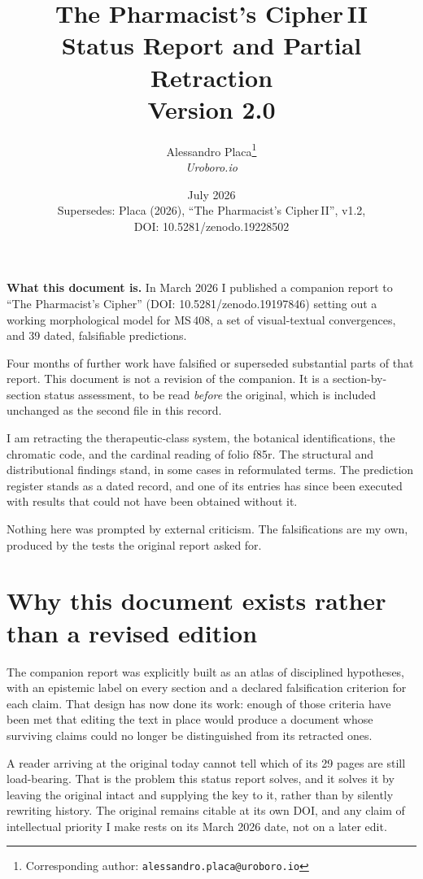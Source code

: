 \documentclass[11pt,a4paper]{article}
\title{\textbf{The Pharmacist's Cipher\,II}\\[0.4em]
\large Status Report and Partial Retraction\\[0.3em]
\normalsize Version 2.0}
\author{Alessandro Placa\thanks{Corresponding author: \texttt{alessandro.placa@uroboro.io}}\\
\textit{Uroboro.io}}
\date{July 2026\\[0.3em]
\small Supersedes: Placa (2026), ``The Pharmacist's Cipher\,II'', v1.2,\\
\small DOI: 10.5281/zenodo.19228502}
\begin{document}
\maketitle

\begin{framed}
\noindent\textbf{What this document is.} In March 2026 I published a companion report to
``The Pharmacist's Cipher'' (DOI: 10.5281/zenodo.19197846) setting out a working morphological
model for MS\,408, a set of visual-textual convergences, and 39 dated, falsifiable predictions.

Four months of further work have falsified or superseded substantial parts of that report. This
document is not a revision of the companion. It is a section-by-section status assessment, to be
read \emph{before} the original, which is included unchanged as the second file in this record.

I am retracting the therapeutic-class system, the botanical identifications, the chromatic code,
and the cardinal reading of folio f85r. The structural and distributional findings stand, in some
cases in reformulated terms. The prediction register stands as a dated record, and one of its
entries has since been executed with results that could not have been obtained without it.

Nothing here was prompted by external criticism. The falsifications are my own, produced by the
tests the original report asked for.
\end{framed}

\section{Why this document exists rather than a revised edition}

The companion report was explicitly built as an atlas of disciplined hypotheses, with an epistemic
label on every section and a declared falsification criterion for each claim. That design has now
done its work: enough of those criteria have been met that editing the text in place would produce
a document whose surviving claims could no longer be distinguished from its retracted ones.

A reader arriving at the original today cannot tell which of its 29 pages are still load-bearing.
That is the problem this status report solves, and it solves it by leaving the original intact and
supplying the key to it, rather than by silently rewriting history. The original remains citable at
its own DOI, and any claim of intellectual priority I make rests on its March 2026 date, not on a
later edit.
\end{document}
